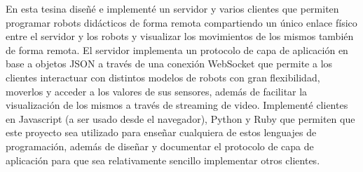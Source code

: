 % 
% 
%
En esta tesina diseñé e implementé un servidor y varios clientes que permiten
programar robots didácticos de forma remota compartiendo un único enlace
físico entre el servidor y los robots y visualizar los movimientos de los
mismos también de forma remota. El servidor implementa un protocolo de capa
de aplicación en base a objetos JSON a través de una conexión WebSocket que
permite a los clientes interactuar con distintos modelos de robots con gran
flexibilidad, moverlos y acceder a los valores de sus sensores, además de
facilitar la visualización de los mismos a través de streaming de video.
Implementé clientes en Javascript (a ser usado desde el navegador),
Python y Ruby que permiten que este proyecto sea utilizado para enseñar
cualquiera de estos lenguajes de programación, además de diseñar y documentar
el protocolo de capa de aplicación para que sea relativamente sencillo
implementar otros clientes.

